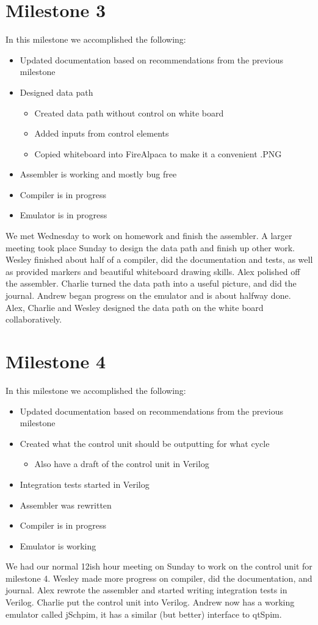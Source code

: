 \documentclass{report}
\begin{document}
	\section{Milestone 3}
		In this milestone we accomplished the following:
		\begin{itemize}
			\item Updated documentation based on recommendations from the previous milestone
			\item Designed data path
			\begin{itemize}
				\item Created data path without control on white board
				\item Added inputs from control elements
				\item Copied whiteboard into FireAlpaca to make it a convenient .PNG
			\end{itemize}
			\item Assembler is working and mostly bug free
			\item Compiler is in progress
			\item Emulator is in progress
		\end{itemize}
		We met Wednesday to work on homework and finish the assembler. A larger meeting took place Sunday to design the data path and finish up other work. Wesley finished about half of a compiler, did the documentation and tests, as well as provided markers and beautiful whiteboard drawing skills. Alex polished off the assembler. Charlie turned the data path into a useful picture, and did the journal. Andrew began progress on the emulator and is about halfway done. Alex, Charlie and Wesley designed the data path on the white board collaboratively.
	\section{Milestone 4}
		In this milestone we accomplished the following:
		\begin{itemize}
			\item Updated documentation based on recommendations from the previous milestone
			\item Created what the control unit should be outputting for what cycle
			\begin{itemize}
				\item Also have a draft of the control unit in Verilog
			\end{itemize}
			\item Integration tests started in Verilog
			\item Assembler was rewritten
			\item Compiler is in progress
			\item Emulator is working
		\end{itemize}
		We had our normal 12ish hour meeting on Sunday to work on the control unit for milestone 4.  Wesley made more progress on compiler, did the documentation, and journal.  Alex rewrote the assembler and started writing integration tests in Verilog.  Charlie put the control unit into Verilog. Andrew now has a working emulator called jSchpim, it has a similar (but better) interface to qtSpim.
\end{document}
